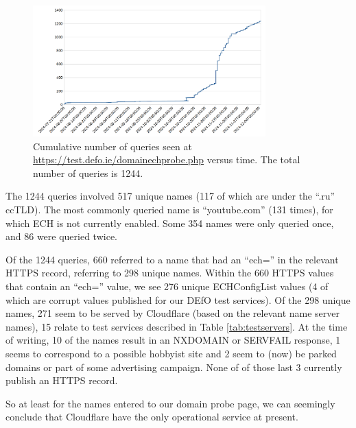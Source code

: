 \begin{figure}
	\centering
	\includegraphics[width=0.8\textwidth,keepaspectratio]{domainprobequeries.png}
		\caption[clustediag]{Cumulative number of queries seen at 
        \url{https://test.defo.ie/domainechprobe.php} versus time. 
        The total number of queries is 1244.} 
	\label{fig:qtimes}
\end{figure}

The 1244 queries involved 517 unique names (117 of which are under
the ``.ru'' ccTLD). The most commonly queried name is ``youtube.com'' (131 times),
for which ECH is not currently enabled. Some 354 names were only queried 
once, and 86 were queried twice.

Of the 1244 queries, 660 referred to a name that had an ``ech='' in
the relevant HTTPS record, referring to 298 unique names.  Within the 660 HTTPS 
values that contain an ``ech='' value, we see 276 unique ECHConfigList values (4 of which are
corrupt values published for our DEfO test services).  Of the 298 unique
names, 271 seem to be served by Cloudflare (based on the relevant name server
names), 15 relate to test services described in Table \ref{tab:testservers}. At
the time of writing, 10 of the names result in an NXDOMAIN or SERVFAIL
response, 1 seems to correspond to a possible hobbyist site and 2 seem to (now)
be parked domains or part of some advertising campaign. None of of those last
3 currently publish an HTTPS record.

So at least for the names entered to our domain probe page, we can seemingly
conclude that Cloudflare have the only operational service at present.
